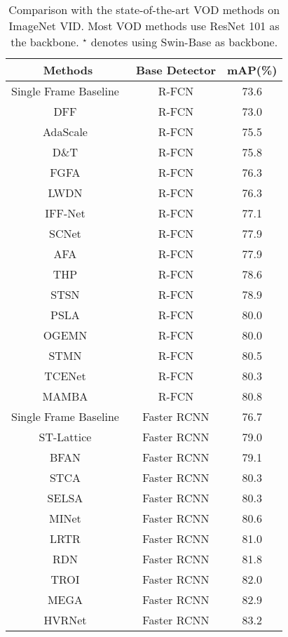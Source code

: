 \documentclass[10pt,journal,compsoc]{IEEEtran}
\begin{document}
\begin{table}[t!]
\caption{Comparison with the state-of-the-art VOD methods on ImageNet VID. Most VOD methods use ResNet 101 as the backbone. $^{\star}$ denotes using Swin-Base as backbone.}
\footnotesize
\vspace{-3mm}
\begin{center}
\begin{tabular}{c|c|c}
\toprule
Methods & Base Detector &  mAP(\%) \\
\midrule
Single Frame Baseline~\cite{dai2016r}  & R-FCN & 73.6 \\ DFF~\cite{zhu17dff}  & R-FCN &73.0\\                AdaScale~\cite{feichtenhofer17dt}  & R-FCN &75.5 \\  D$\&$T~\cite{chin2019adascale}  & R-FCN &75.8 \\  FGFA~\cite{zhu17fgfa}& R-FCN &76.3\\             LWDN~\cite{jiang2019video} & R-FCN &76.3\\
IFF-Net~\cite{jin2022feature} & R-FCN &77.1\\
SCNet~\cite{wang2020scnet} & R-FCN &77.9\\
AFA~\cite{qian2020adaptive} & R-FCN &77.9\\
THP~\cite{zhu18hp} & R-FCN &78.6\\           STSN~\cite{bertasius18stsn}  & R-FCN  &78.9\\   PSLA~\cite{guo2019progressive}  & R-FCN  & 80.0 \\OGEMN~\cite{deng2019ogemn}  & R-FCN  & 80.0 \\ STMN~\cite{xiao18stmn}  & R-FCN  & 80.5 \\ TCENet~\cite{he2020temporal}  & R-FCN  & 80.3 \\
MAMBA~\cite{sun2021mamba}  & R-FCN  & 80.8 \\
\midrule
Single Frame Baseline~\cite{ren2016faster} & Faster RCNN & 76.7 \\ST-Lattice~\cite{chen2018optimizing} &  Faster RCNN &79.0\\BFAN~\cite{wu2020bfan} &  Faster RCNN &79.1\\STCA~\cite{luo2019object}   &  Faster RCNN & 80.3 \\
SELSA~\cite{wu19selsa}& Faster RCNN & 80.3\\MINet~\cite{MINet}& Faster RCNN & 80.6\\
LRTR~\cite{shvets19lltr} & Faster RCNN  & 81.0 \\RDN~\cite{deng19rdn}   & Faster RCNN & 81.8\\TROI~\cite{gong2021temporal}   & Faster RCNN & 82.0\\MEGA~\cite{chen2020memory} & Faster RCNN  & 82.9\\HVRNet~\cite{han2020mining} & Faster RCNN  & 83.2\\

\end{tabular}
\end{center}
\end{table}
\end{document}
